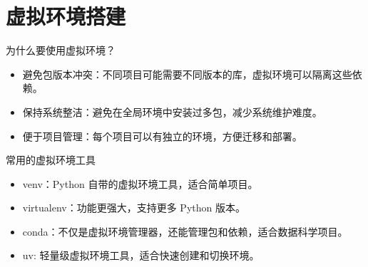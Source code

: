 \documentclass[9pt]{ctexbeamer}
\begin{document}
\section{虚拟环境搭建}

\begin{frame}{为什么要使用虚拟环境？}
	\begin{itemize}
		\item 避免包版本冲突：不同项目可能需要不同版本的库，虚拟环境可以隔离这些依赖。
		\item 保持系统整洁：避免在全局环境中安装过多包，减少系统维护难度。
		\item 便于项目管理：每个项目可以有独立的环境，方便迁移和部署。
	\end{itemize}
\end{frame}

\begin{frame}{常用的虚拟环境工具}
	\begin{itemize}
		\item venv：Python 自带的虚拟环境工具，适合简单项目。
		\item virtualenv：功能更强大，支持更多 Python 版本。
		\item conda：不仅是虚拟环境管理器，还能管理包和依赖，适合数据科学项目。
		\item uv: 轻量级虚拟环境工具，适合快速创建和切换环境。
	\end{itemize}
\end{frame}
\end{document}
